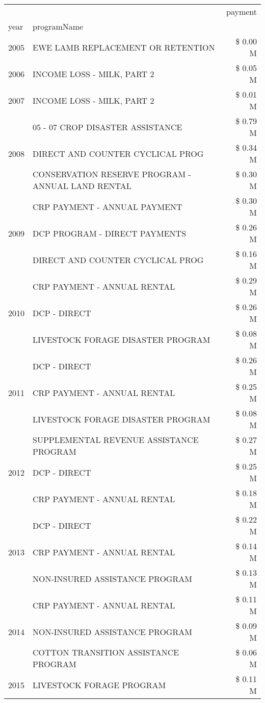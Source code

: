 \begin{tabular}{llr}
\toprule
 &  & payment \\
year & programName &  \\
\midrule
2005 & EWE LAMB REPLACEMENT OR RETENTION & \$ 0.00 M \\
\cline{1-3}
2006 & INCOME LOSS - MILK, PART 2 & \$ 0.05 M \\
\cline{1-3}
2007 & INCOME LOSS - MILK, PART 2 & \$ 0.01 M \\
\cline{1-3}
\multirow[t]{3}{*}{2008} & 05 - 07 CROP DISASTER ASSISTANCE & \$ 0.79 M \\
 & DIRECT AND COUNTER CYCLICAL PROG & \$ 0.34 M \\
 & CONSERVATION RESERVE PROGRAM - ANNUAL LAND RENTAL & \$ 0.30 M \\
\cline{1-3}
\multirow[t]{3}{*}{2009} & CRP PAYMENT - ANNUAL PAYMENT & \$ 0.30 M \\
 & DCP PROGRAM - DIRECT PAYMENTS & \$ 0.26 M \\
 & DIRECT AND COUNTER CYCLICAL PROG & \$ 0.16 M \\
\cline{1-3}
\multirow[t]{3}{*}{2010} & CRP PAYMENT - ANNUAL RENTAL & \$ 0.29 M \\
 & DCP - DIRECT & \$ 0.26 M \\
 & LIVESTOCK FORAGE DISASTER PROGRAM & \$ 0.08 M \\
\cline{1-3}
\multirow[t]{3}{*}{2011} & DCP - DIRECT & \$ 0.26 M \\
 & CRP PAYMENT - ANNUAL RENTAL & \$ 0.25 M \\
 & LIVESTOCK FORAGE DISASTER PROGRAM & \$ 0.08 M \\
\cline{1-3}
\multirow[t]{3}{*}{2012} & SUPPLEMENTAL REVENUE ASSISTANCE PROGRAM & \$ 0.27 M \\
 & DCP - DIRECT & \$ 0.25 M \\
 & CRP PAYMENT - ANNUAL RENTAL & \$ 0.18 M \\
\cline{1-3}
\multirow[t]{3}{*}{2013} & DCP - DIRECT & \$ 0.22 M \\
 & CRP PAYMENT - ANNUAL RENTAL & \$ 0.14 M \\
 & NON-INSURED ASSISTANCE PROGRAM & \$ 0.13 M \\
\cline{1-3}
\multirow[t]{3}{*}{2014} & CRP PAYMENT - ANNUAL RENTAL & \$ 0.11 M \\
 & NON-INSURED ASSISTANCE PROGRAM & \$ 0.09 M \\
 & COTTON TRANSITION ASSISTANCE PROGRAM & \$ 0.06 M \\
\cline{1-3}
\multirow[t]{3}{*}{2015} & LIVESTOCK FORAGE PROGRAM & \$ 0.11 M \\

\end{tabular}
